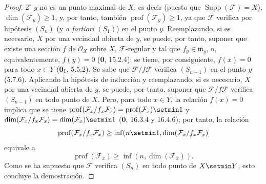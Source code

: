 \begin{proof}
$2^\circ$ $y$ no es un punto maximal de $X$, es decir (puesto que
$\operatorname{Supp}(\mathcal F)=X$), $\dim(\mathcal F_y)\geq1$, y, por tanto, también
$\operatorname{prof}(\mathcal F_y)\geq1$, ya que $\mathcal F$ verifica por
hipótesis $(S_n)$ (y \emph{a fortiori} $(S_1)$) en el punto $y$. Reemplazando, si es
necesario, $X$ por una vecindad abierta de $y$, se puede, por tanto, suponer
que existe una sección $f$ de $\mathcal O_X$ sobre $X$, $\mathcal F$-regular y
tal que $f_y\in\mathfrak m_y$, o, equivalentemente, $f(y)=0$ (\textbf 0, 15.2.4); se tiene,
por consiguiente, $f(x)=0$ para todo $x\in Y$ (\textbf{0}$_{\rm I}$, 5.5.2). Se sabe que
$\mathcal F/f\mathcal F$ verifica $(S_{n-1})$ en el punto $y$ (5.7.6).
Aplicando la hipótesis de inducción y reemplazando, si es necesario, $X$ por una
vecindad abierta de $y$, se puede, por tanto, suponer que
$\mathcal F/f\mathcal F$ verifica $(S_{n-1})$ en todo punto de $X$. Pero, para
todo $x\in Y$, la relación $f(x)=0$ implica que se tiene
$\operatorname{prof}(\mathcal F_x/f_x\mathcal F_x)=
\operatorname{prof}(\mathcal F_x)\setmin 1$ y
$\dim(\mathcal F_x/f_x\mathcal F_x)=\dim(\mathcal F_x)\setmin 1$
(\textbf 0, 16.3.4 y 16.4.6); por tanto, la relación
\[
\operatorname{prof}(\mathcal F_x/f_x\mathcal F_x)\geq
\inf(n\setmin 1,\dim(\mathcal F_x/f_x\mathcal F_x)
\]
equivale a
\[
\operatorname{prof}(\mathcal F_x)\geq\inf(n,\dim(\mathcal F_x)).
\]
Como se ha supuesto que $\mathcal F$ verifica $(S_n)$ en todo punto de $X\setmin Y$,
esto concluye la demostración.
\end{proof}

